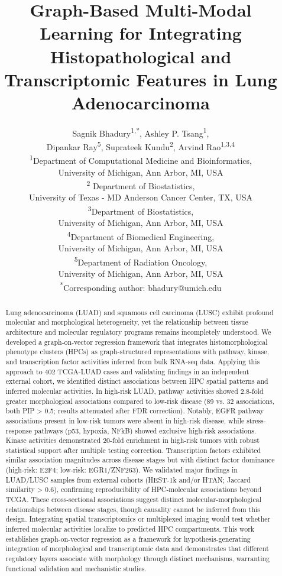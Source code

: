\documentclass[pdflatex,article,12pt]{article}
\title{Graph-Based Multi-Modal Learning for Integrating Histopathological and Transcriptomic Features in Lung Adenocarcinoma}
\author{
Sagnik Bhadury\textsuperscript{1,*},
Ashley P. Tsang\textsuperscript{1}, \\
Dipankar Ray\textsuperscript{5},
Suprateek Kundu\textsuperscript{2},
Arvind Rao\textsuperscript{1,3,4}\\
\small \textsuperscript{1}Department of Computational Medicine and Bioinformatics, \\ \small University of Michigan, Ann Arbor, MI, USA\\
\small \textsuperscript{2} Department of Biostatistics, \\ \small University of Texas - MD Anderson Cancer Center, TX, USA \\
\small \textsuperscript{3}Department of Biostatistics, \\ \small University of Michigan, Ann Arbor, MI, USA\\
\small \textsuperscript{4}Department of Biomedical Engineering,\\\small University of Michigan, Ann Arbor, MI, USA\\
\small \textsuperscript{5}Department of Radiation Oncology,\\\small University of Michigan, Ann Arbor, MI, USA\\
\small \textsuperscript{*}Corresponding author: bhadury@umich.edu
}
\begin{document}
\maketitle

\begin{abstract}
    Lung adenocarcinoma (LUAD) and squamous cell carcinoma (LUSC) exhibit profound molecular and morphological heterogeneity, yet the relationship between tissue architecture and molecular regulatory programs remains incompletely understood. We developed a graph-on-vector regression framework that integrates histomorphological phenotype clusters (HPCs) as graph-structured representations with pathway, kinase, and transcription factor activities inferred from bulk RNA-seq data. Applying this approach to 402 TCGA-LUAD cases and validating findings in an independent external cohort, we identified distinct associations between HPC spatial patterns and inferred molecular activities. In high-risk LUAD, pathway activities showed 2.8-fold greater morphological associations compared to low-risk disease (89 vs. 32 associations, both PIP > 0.5; results attenuated after FDR correction). Notably, EGFR pathway associations present in low-risk tumors were absent in high-risk disease, while stress-response pathways (p53, hypoxia, NFkB) showed exclusive high-risk associations. Kinase activities demonstrated 20-fold enrichment in high-risk tumors with robust statistical support after multiple testing correction. Transcription factors exhibited similar association magnitudes across disease stages but with distinct factor dominance (high-risk: E2F4; low-risk: EGR1/ZNF263). We validated major findings in LUAD/LUSC samples from external cohorts (HEST-1k and/or HTAN; Jaccard similarity > 0.6), confirming reproducibility of HPC-molecular associations beyond TCGA. These cross-sectional associations suggest distinct molecular-morphological relationships between disease stages, though causality cannot be inferred from this design. Integrating spatial transcriptomics or multiplexed imaging would test whether inferred molecular activities localize to predicted HPC compartments. This work establishes graph-on-vector regression as a framework for hypothesis-generating integration of morphological and transcriptomic data and demonstrates that different regulatory layers associate with morphology through distinct mechanisms, warranting functional validation and mechanistic studies.
\end{abstract}
\end{document}
